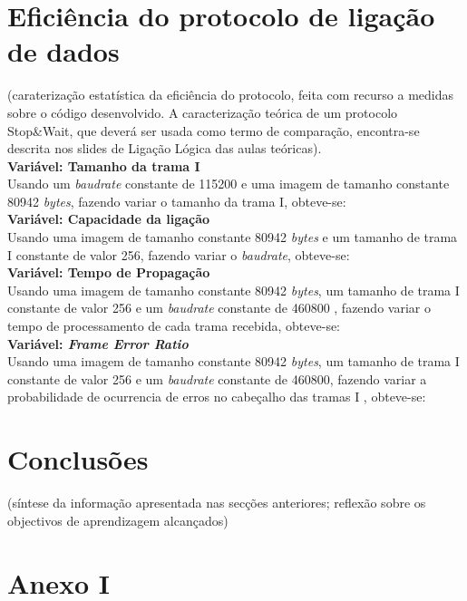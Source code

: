 \documentclass[a4paper, 11pt]{article}
\begin{document}
\section{Eficiência do protocolo de ligação de dados}

(caraterização estatística da  eficiência do protocolo, feita com recurso a medidas sobre o código desenvolvido. A caracterização teórica de um protocolo Stop\&Wait, que deverá ser usada como termo de comparação, encontra-se descrita nos slides de Ligação Lógica das aulas teóricas). \\

\textbf{Variável: Tamanho da trama I}\\
Usando um \textit{baudrate} constante de 115200 e uma imagem de tamanho constante 80942 \textit{bytes}, fazendo variar o tamanho da trama I, obteve-se:\\


\textbf{Variável: Capacidade da ligação}\\
Usando uma imagem de tamanho constante 80942 \textit{bytes} e um tamanho de trama I constante de valor 256, fazendo variar o \textit{baudrate}, obteve-se:\\

\textbf{Variável: Tempo de Propagação}\\
Usando uma imagem de tamanho constante 80942 \textit{bytes}, um tamanho de trama I constante de valor 256 e um \textit{baudrate} constante de 460800 , fazendo variar o tempo de processamento de cada trama recebida, obteve-se:\\

\textbf{Variável: \textit{Frame Error Ratio}}\\
Usando uma imagem de tamanho constante 80942 \textit{bytes}, um tamanho de trama I constante de valor 256 e um \textit{baudrate} constante de 460800, fazendo variar a probabilidade de ocurrencia de erros no cabeçalho das tramas I , obteve-se:\\

\newpage

\section{Conclusões}

  (síntese da informação apresentada nas secções anteriores; reflexão sobre os objectivos de aprendizagem alcançados)
\newpage

\section{Anexo I}
\begin{lstlisting}[language=C]


\end{lstlisting}
\end{document}
